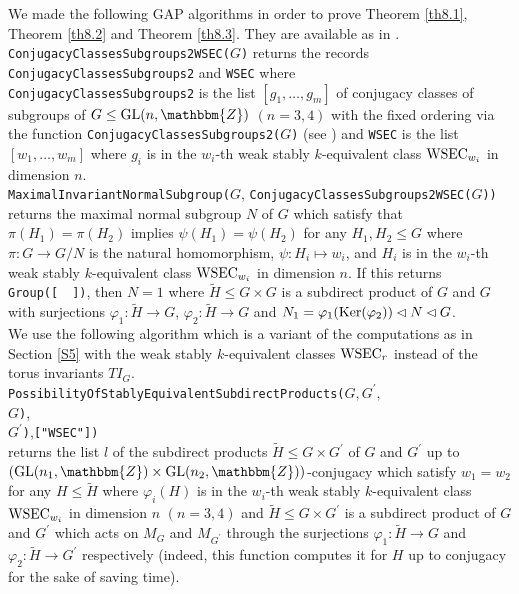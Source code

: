 \documentclass{amsart}
\theoremstyle{plain}
\theoremstyle{definition}
\theoremstyle{remark}
\newcommand{\bZ}{\mathbbm{Z}}\newcommand{\bQ}{\mathbbm{Q}}
\newcommand{\GL}{{\rm GL}}\newcommand{\SL}{{\rm SL}}
\newcounter{sub}\def\tr{\mbox{tr }}
\begin{document}
{We made the following GAP \cite{GAP} algorithms 
in order to prove 
Theorem \ref{th8.1}, Theorem \ref{th8.2} and Theorem \ref{th8.3}. 
They are available as in \cite{BCAlgTori}.\\

\noindent 
{\tt ConjugacyClassesSubgroups2WSEC(}$G${\tt )} 
returns the records 
{\tt ConjugacyClassesSubgroups2} and 
{\tt WSEC}
where\\ 
{\tt ConjugacyClassesSubgroups2} 
is the list $[g_1,\ldots,g_m]$ 
of conjugacy classes of subgroups of $G\leq \GL(n,\bZ)$ $(n=3,4)$ 
with the fixed ordering via the function 
{\tt ConjugacyClassesSubgroups2(}$G${\tt )} 
(see \cite[Section 4.1]{HY17}) and 
{\tt WSEC} 
is the list $[w_1,\ldots,w_m]$ where 
$g_i$ is in the $w_i$-th weak stably $k$-equivalent class 
${\rm WSEC}_{w_i}$ in dimension $n$.\\

\noindent
{\tt MaximalInvariantNormalSubgroup(}$G$,
{\tt ConjugacyClassesSubgroups2WSEC(}$G${\tt ))}
returns the maximal normal subgroup $N$ of $G$
which satisfy that $\pi(H_1)=\pi(H_2)$ implies $\psi(H_1)=\psi(H_2)$ 
for any $H_1,H_2\leq G$ 
where $\pi:G\rightarrow G/N$ is the natural homomorphism, 
$\psi : H_i\mapsto w_i$,  
and $H_i$ is in the $w_i$-th weak stably $k$-equivalent class 
${\rm WSEC}_{w_i}$ in dimension $n$. 
If this returns {\tt Group([}\ \ {\tt])}, then $N=1$ 
where 
$\widetilde{H}\leq G\times G$ is a 
subdirect product of $G$ and $G$ with 
surjections $\varphi_1:\widetilde{H}\rightarrow G$, 
$\varphi_2:\widetilde{H}\rightarrow G$ and 
$N_1=\varphi_1({\rm Ker}(\varphi_2))\lhd N\lhd G$.\\

We use the following algorithm 
which is a variant of the computations as in Section \ref{S5} 
with the weak stably $k$-equivalent classes ${\rm WSEC}_r$ 
instead of the torus invariants $TI_G$.\\

\noindent 
{\tt PossibilityOfStablyEquivalentSubdirectProducts(}$G,G^\prime,$\\
$G${\tt )},\\
$G^\prime${\tt )},{\tt ["WSEC"])}\\
returns the list $l$ of the subdirect products 
$\widetilde{H}\leq G\times G^\prime$ of $G$ and $G^\prime$ 
up to $(\GL(n_1,\bZ)\times \GL(n_2,\bZ))$-conjugacy  
which satisfy $w_1=w_2$ 
for any $H\leq \widetilde{H}$ 
where $\varphi_i(H)$ is in the $w_i$-th weak stably $k$-equivalent class 
${\rm WSEC}_{w_i}$ in dimension $n$ $(n=3,4)$
and 
$\widetilde{H}\leq G\times G^\prime$ 
is a subdirect product of $G$ and $G^\prime$ 
which acts on $M_G$ and $M_{G^\prime}$ 
through the surjections $\varphi_1: \widetilde{H} \rightarrow G$ 
and $\varphi_2: \widetilde{H} \rightarrow G^\prime$ respectively 
(indeed, this function computes it for $H$ up to conjugacy 
for the sake of saving time).\\

}
\end{document}
